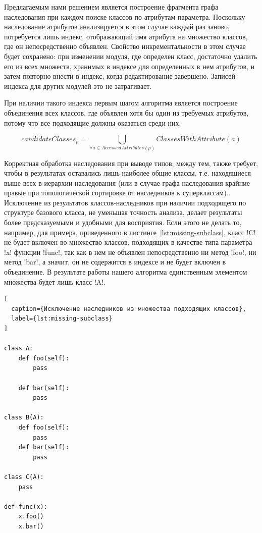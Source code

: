 Предлагаемым нами решением является построение фрагмента графа наследования при
каждом поиске классов по атрибутам параметра. Поскольку наследование атрибутов
анализируется в этом случае каждый раз заново, потребуется лишь индекс,
отображающий имя атрибута на множество классов, где он непосредственно объявлен.
Свойство инкрементальности в этом случае будет сохранено: при
изменении модуля, где определен класс, достаточно удалить его из всех множеств,
хранимых в индексе для определенных в нем атрибутов, и затем повторно внести в
индекс, когда редактирование завершено. Записей индекса для других модулей это
не затрагивает.

При наличии такого индекса первым шагом алгоритма является построение
объединения всех классов, где объявлен хотя бы один из требуемых атрибутов,
потому что все подходящие должны оказаться среди них.

\[
  candidateClasses_p = \bigcup\limits_{\forall{a} \in AccessedAttributes(p)}
  ClassesWithAttribute(a)
\]

Корректная обработка наследования при выводе типов, между тем, также требует,
чтобы в результатах оставались лишь наиболее общие классы, т.е. находящиеся выше
всех в иерархии наследования (или в случае графа наследования крайние правые при
топологической сортировке от наследников к суперклассам). Исключение из
результатов классов-наследников при наличии подходящего по структуре базового
класса, не уменьшая точность анализа, делает результаты более предсказуемыми и
удобными для восприятия. Если этого не делать то, например, для
примера, приведенного в листинге~\ref{lst:missing-subclass}, класс !C! не будет
включен во множество классов, подходящих в качестве типа параметра !x! функции
!func!, так как в нем не объявлен непосредственно ни метод !foo!, ни метод
!bar!, а значит, он не содержится в индексе и не будет включен в объединение. В
результате работы нашего алгоритма единственным элементом множества будет лишь
класс !A!.

\begin{lstlisting}[
  caption={Исключение наследников из множества подходящих классов},
  label={lst:missing-subclass}
]

class A:
    def foo(self):
        pass

    def bar(self):
        pass

class B(A):
    def foo(self):
        pass
    def bar(self):
        pass

class C(A):
    pass

def func(x):
    x.foo()
    x.bar()
    
\end{lstlisting}


